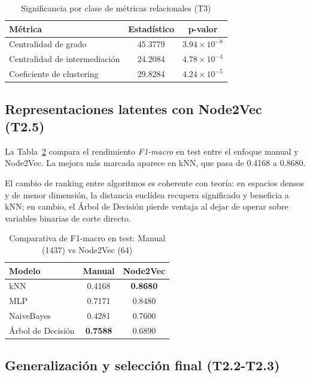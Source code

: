 \documentclass[conference,a4paper]{IEEEtran}
\begin{document}
\begin{table}[htbp]
\caption{Significancia por clase de métricas relacionales (T3)}
\centering
\begin{tabular}{lcc}
\toprule
Métrica & Estadístico & p-valor \\
\midrule
Centralidad de grado & 45.3779 & $3.94\times10^{-8}$ \\
Centralidad de intermediación & 24.2084 & $4.78\times10^{-4}$ \\
Coeficiente de clustering & 29.8284 & $4.24\times10^{-5}$ \\
\bottomrule
\end{tabular}
\label{tab:kruskal}
\end{table}


\subsection{Representaciones latentes con Node2Vec (T2.5)}

La Tabla~\ref{tab:comparativa} compara el rendimiento \textit{F1-macro} en test entre el enfoque manual y Node2Vec. La mejora más marcada aparece en kNN, que pasa de 0.4168 a 0.8680.

El cambio de ranking entre algoritmos es coherente con teoría: en espacios densos y de menor dimensión, la distancia euclídea recupera significado y beneficia a kNN; en cambio, el Árbol de Decisión pierde ventaja al dejar de operar sobre variables binarias de corte directo.

\begin{table}[htbp]
\caption{Comparativa de F1-macro en test: Manual (1437) vs Node2Vec (64)}
\centering
\begin{tabular}{lcc}
\toprule
Modelo & Manual & Node2Vec \\
\midrule
kNN & 0.4168 & \textbf{0.8680} \\
MLP & 0.7171 & 0.8480 \\
NaiveBayes & 0.4281 & 0.7600 \\
Árbol de Decisión & \textbf{0.7588} & 0.6890 \\
\bottomrule
\end{tabular}
\label{tab:comparativa}
\end{table}

\subsection{Generalización y selección final (T2.2-T2.3)}
\end{document}
